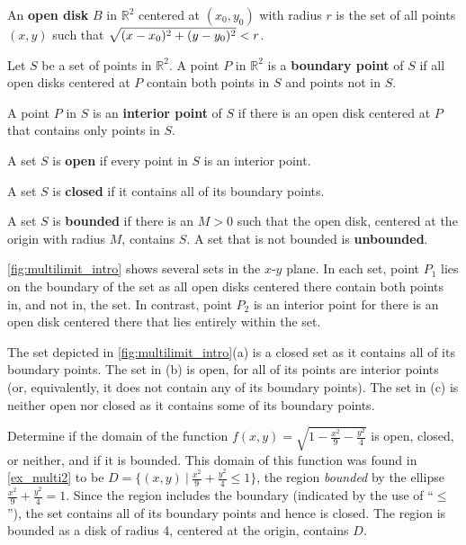 
\begin{definition}\label{def:open}%
An \textbf{open disk} $B$ in $\mathbb{R}^2$ centered at $(x_0,y_0)$ with radius $r$ is the set of all points $(x,y)$ such that $\displaystyle\sqrt{(x-x_0)^2+(y-y_0)^2} < r$. \bigskip

Let $S$ be a set of points in $\mathbb{R}^2$. A point $P$ in $\mathbb{R}^2$ is a \textbf{boundary point} of $S$  if all open disks centered at $P$ contain both points in $S$ and points not in $S$.\bigskip

A point $P$ in $S$ is an \textbf{interior point} of $S$ if there is an open disk centered at $P$ that contains only points in $S$.\bigskip

A set $S$ is \textbf{open} if every point in $S$ is an interior point.\bigskip

A set $S$ is \textbf{closed} if it contains all of its boundary points.\bigskip

A set $S$ is \textbf{bounded} if there is an $M>0$ such that the open disk, centered at the origin with radius $M$, contains $S$. A set that is not bounded is \textbf{unbounded}.
\end{definition}

\autoref{fig:multilimit_intro} shows several sets in the $x$-$y$ plane. In each set, point $P_1$ lies on the boundary of the set as all open disks centered there contain both points in, and not in, the set. In contrast, point $P_2$ is an interior point for there is an open disk centered there that lies entirely within the set.

The set depicted in \autoref{fig:multilimit_intro}(a) is a closed set as it contains all of its boundary points. The set in (b) is open, for all of its points are interior points (or, equivalently, it does not contain any of its boundary points). The set in (c) is neither open nor closed as it contains  some of its boundary points.

\begin{example}\label{ex_multilimit1}%
Determine if the domain of the function $f(x,y)=\sqrt{1-\frac{x^2}9-\frac{y^2}4}$ is open, closed, or neither, and if it is bounded.
\solution
This domain of this function was found in \autoref{ex_multi2} to be $D = \{(x,y)\ |\ \frac{x^2}9+\frac{y^2}4\leq 1\}$, the region \emph{bounded} by the ellipse $\frac{x^2}9+\frac{y^2}4=1$. Since the region includes the boundary (indicated by the use of ``$\leq$''), the set contains all of its boundary points and hence is closed. The region is bounded as a disk of radius 4, centered at the origin, contains $D$.
\end{example}

